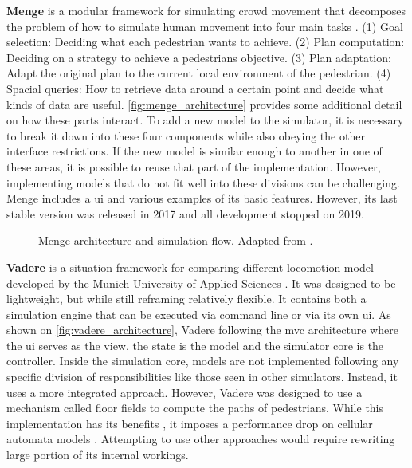 \documentclass[twoside, 11pt]{article}
\begin{document}
\textbf{Menge} is a modular framework for simulating crowd movement that decomposes the problem of how to simulate human movement into four main tasks \cite{curtisMengeModularFramework2016}. (1) Goal selection: Deciding what each pedestrian wants to achieve. (2) Plan computation: Deciding on a strategy to achieve a pedestrians objective. (3) Plan adaptation: Adapt the original plan to the current local environment of the pedestrian. (4) Spacial queries: How to retrieve data around a certain point and decide what kinds of data are useful. \autoref{fig:menge_architecture} provides some additional detail on how these parts interact. To add a new model to the simulator, it is necessary to break it down into these four components while also obeying the other interface restrictions. If the new model is similar enough to another in one of these areas, it is possible to reuse that part of the implementation. However, implementing models that do not fit well into these divisions can be challenging. Menge includes a \gls{ui} and various examples of its basic features. However, its last stable version was released in 2017 and all development stopped on 2019.

\begin{figure}[h]
  \centering
  
  \caption{Menge architecture and simulation flow. Adapted from \cite{curtisMengeModularFramework2016}.}
  \label{fig:menge_architecture}
\end{figure}


\textbf{Vadere} is a situation framework for comparing different locomotion model developed by the Munich University of Applied Sciences \cite{kleinmeierVadereOpenSourceSimulation2019}. It was designed to be lightweight, but while still reframing relatively flexible. It contains both a simulation engine that can be executed via command line or via its own \gls{ui}. As shown on \autoref{fig:vadere_architecture}, Vadere following the \gls{mvc} architecture where the \gls{ui} serves as the view, the state is the model and the simulator core is the controller. Inside the simulation core, models are not implemented following any specific division of responsibilities like those seen in other simulators. Instead, it uses a more integrated approach. However, Vadere was designed to use a mechanism called floor fields to compute the paths of pedestrians. While this implementation has its benefits \cite{seitzSuperpositionPrincipleConceptual2016}, it imposes a performance drop on cellular automata models \cite{kleinmeierVadereOpenSourceSimulation2019}. Attempting to use other approaches would require rewriting large portion of its internal workings.
\end{document}
